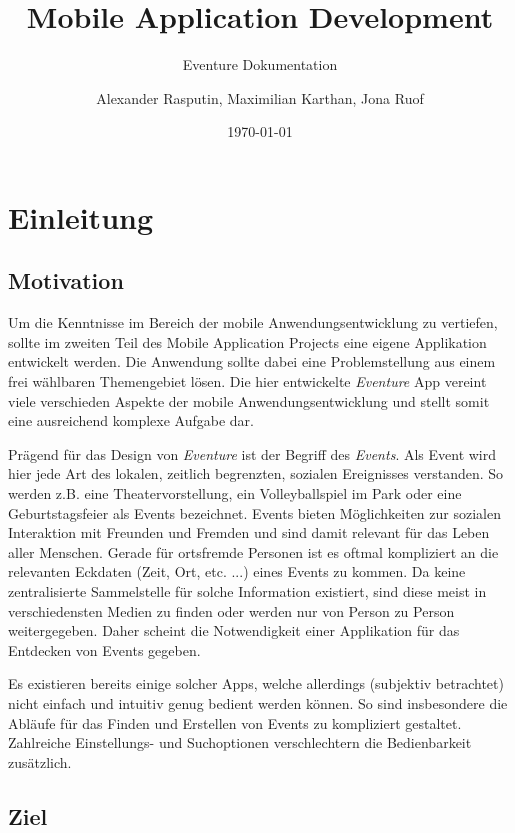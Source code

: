 \documentclass{scrartcl}
\title{Mobile Application Development}
\subtitle{Eventure Dokumentation}
\date{\today}
\author{Alexander Rasputin, Maximilian Karthan, Jona Ruof}
\begin{document}
\maketitle
\newpage
\tableofcontents

\newpage

\section{Einleitung}
\subsection{Motivation}

Um die Kenntnisse im Bereich der mobile Anwendungsentwicklung zu vertiefen,
sollte im zweiten Teil des Mobile Application Projects eine eigene Applikation
entwickelt werden. Die Anwendung sollte dabei eine Problemstellung aus einem
frei wählbaren Themengebiet lösen. Die hier entwickelte \emph{Eventure} App
vereint viele verschieden Aspekte der mobile Anwendungsentwicklung und stellt
somit eine ausreichend komplexe Aufgabe dar.

Prägend für das Design von \emph{Eventure} ist der Begriff des \emph{Events}.
Als Event wird hier jede Art des lokalen, zeitlich begrenzten, sozialen
Ereignisses verstanden. So werden z.B. eine Theatervorstellung, ein
Volleyballspiel im Park oder eine Geburtstagsfeier als Events bezeichnet. Events
bieten Möglichkeiten zur sozialen Interaktion mit Freunden und Fremden und sind
damit relevant für das Leben aller Menschen. Gerade für ortsfremde Personen ist
es oftmal kompliziert an die relevanten Eckdaten (Zeit, Ort, etc. ...) eines
Events zu kommen. Da keine zentralisierte Sammelstelle für solche Information
existiert, sind diese meist in verschiedensten Medien zu finden oder werden nur
von Person zu Person weitergegeben. Daher scheint die Notwendigkeit einer
Applikation für das Entdecken von Events gegeben.

Es existieren bereits einige solcher Apps, welche allerdings (subjektiv
betrachtet) nicht einfach und intuitiv genug bedient werden können. So sind
insbesondere die Abläufe für das Finden und Erstellen von Events zu kompliziert
gestaltet. Zahlreiche Einstellungs- und Suchoptionen verschlechtern die
Bedienbarkeit zusätzlich.

\subsection{Ziel}
\end{document}
